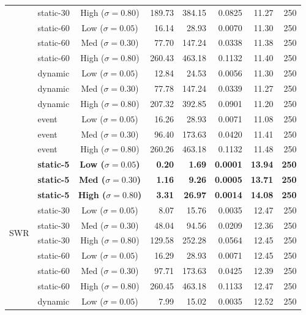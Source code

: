 \documentclass[11pt,a4paper]{article}
\begin{document}
\begin{small}
\begin{longtable}{llcrrrrr}
  & static-30 & High ($\sigma=0.80$)   & 189.73 & 384.15 & 0.0825 & 11.27 & 250 \\
  & static-60 & Low ($\sigma=0.05$)    &  16.14 &  28.93 & 0.0070 & 11.30 & 250 \\
  & static-60 & Med ($\sigma=0.30$)    &  77.70 & 147.24 & 0.0338 & 11.38 & 250 \\
  & static-60 & High ($\sigma=0.80$)   & 260.43 & 463.18 & 0.1132 & 11.40 & 250 \\
  & dynamic   & Low ($\sigma=0.05$)    &  12.84 &  24.53 & 0.0056 & 11.30 & 250 \\
  & dynamic   & Med ($\sigma=0.30$)    &  77.78 & 147.24 & 0.0339 & 11.27 & 250 \\
  & dynamic   & High ($\sigma=0.80$)   & 207.32 & 392.85 & 0.0901 & 11.20 & 250 \\
  & event     & Low ($\sigma=0.05$)    &  16.26 &  28.93 & 0.0071 & 11.08 & 250 \\
  & event     & Med ($\sigma=0.30$)    &  96.40 & 173.63 & 0.0420 & 11.41 & 250 \\
  & event     & High ($\sigma=0.80$)   & 260.26 & 463.18 & 0.1132 & 11.48 & 250 \\
\midrule
\multirow{15}{*}{SWR}
  & \textbf{static-5} & \textbf{Low ($\sigma=0.05$)}
    & \textbf{0.20} & \textbf{1.69} & \textbf{0.0001} & \textbf{13.94} & \textbf{250} \\
  & \textbf{static-5} & \textbf{Med ($\sigma=0.30$)}
    & \textbf{1.16} & \textbf{9.26} & \textbf{0.0005} & \textbf{13.71} & \textbf{250} \\
  & \textbf{static-5} & \textbf{High ($\sigma=0.80$)}
    & \textbf{3.31} & \textbf{26.97} & \textbf{0.0014} & \textbf{14.08} & \textbf{250} \\
  & static-30 & Low ($\sigma=0.05$)    &   8.07 &  15.76 & 0.0035 & 12.47 & 250 \\
  & static-30 & Med ($\sigma=0.30$)    &  48.04 &  94.56 & 0.0209 & 12.36 & 250 \\
  & static-30 & High ($\sigma=0.80$)   & 129.58 & 252.28 & 0.0564 & 12.45 & 250 \\
  & static-60 & Low ($\sigma=0.05$)    &  16.29 &  28.93 & 0.0071 & 12.45 & 250 \\
  & static-60 & Med ($\sigma=0.30$)    &  97.71 & 173.63 & 0.0425 & 12.39 & 250 \\
  & static-60 & High ($\sigma=0.80$)   & 260.45 & 463.18 & 0.1133 & 12.47 & 250 \\
  & dynamic   & Low ($\sigma=0.05$)    &   7.99 &  15.02 & 0.0035 & 12.52 & 250 \\

\end{longtable}
\end{small}
\end{document}

